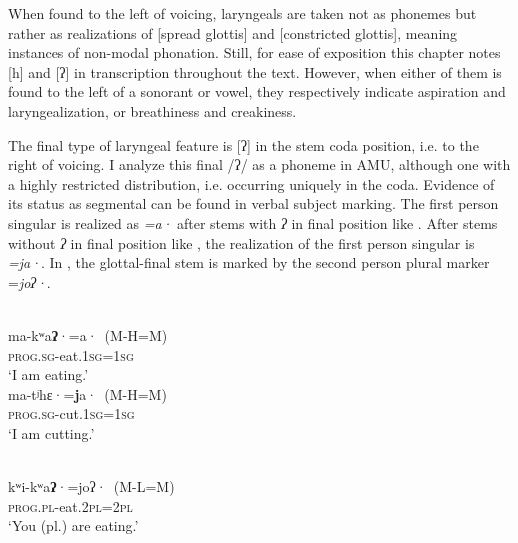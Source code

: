 \documentclass[output=paper]{langscibook}
\begin{document}
When found to the left of voicing, laryngeals are taken not as phonemes but rather as realizations of [spread glottis] and [constricted glottis], meaning instances of non-modal phonation. Still, for ease of exposition this chapter notes [h] and [ʔ] in transcription throughout the text. However, when either of them is found to the left of a sonorant or vowel, they respectively indicate aspiration and laryngealization, or breathiness and creakiness.

The final type of laryngeal feature is [ʔ] in the stem coda position, i.e. to the right of voicing. I analyze this final /ʔ/ as a phoneme in AMU, although one with a highly restricted distribution, i.e. occurring uniquely in the coda. Evidence of its status as segmental can be found in verbal subject marking. The first person singular is realized as \textit{=a·} after stems with \textit{ʔ} in final position like . After stems without \textit{ʔ} in final position like , the realization of the first person singular is \textit{=ja·}. In , the glottal-final stem is marked by the second person plural marker =\textit{joʔ·}.

\clearpage
\ea\label{ex:dobui:22}
{\citet[6, 56]{ApóstolPolanco2014}}\\
\ea\label{ex:dobui:22a}
\gll ma-kʷa\textbf{ʔ}·=a·~(M-H=M) \\
     \textsc{prog.sg}-eat.\textsc{1sg=1sg}\\
\glt ‘I am eating.’\\
\ex\label{ex:dobui:22b}
\gll ma-tʲhɛ·=\textbf{j}a·~(M-H=M) \\
     \textsc{prog.sg}-cut.\textsc{1sg=1sg} \\
\glt ‘I am cutting.’\\
\z
\z

\ea\label{ex:dobui:23}
{\citet[7]{ApóstolPolanco2014}}\\
\gll kʷi-kʷa\textbf{ʔ}·=joʔ·~(M-L=M)\\
     \textsc{prog.pl}-eat.\textsc{2pl}=2\textsc{pl}\\
\glt ‘You (pl.) are eating.’
\z
\end{document}
